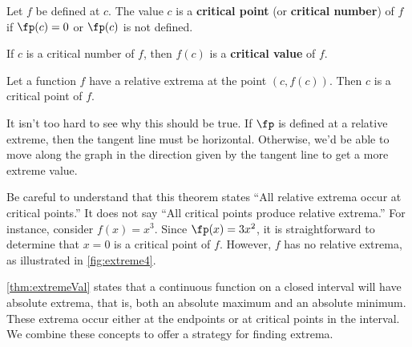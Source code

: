 \begin{definition}\label{def:criticalnum}
Let $f$ be defined at $c$. The value $c$ is a \textbf{critical point} (or \textbf{critical number}) of $f$ if $\fp(c)=0$ or $\fp(c)$ is not defined.\bigskip

If $c$ is a critical number of $f$, then $f(c)$ is a \textbf{critical value} of $f$.
\end{definition}

\begin{theorem}\label{thm:criticalpts}
Let a function $f$ have a relative extrema at the point $(c,f(c))$. Then $c$ is a critical point of $f$.
\end{theorem}%

It isn't too hard to see why this should be true.  If $\fp$ is defined at a relative extreme, then the tangent line must be horizontal.  Otherwise, we'd be able to move along the graph in the direction given by the tangent line to get a more extreme value.


Be careful to understand that this theorem states  ``All relative extrema occur at critical points.'' It does not say ``All critical points produce relative extrema.'' For instance, consider $f(x) = x^3$. Since $\fp(x) = 3x^2$, it is straightforward to determine that $x=0$ is a critical point of $f$. However, $f$ has no relative extrema, as illustrated in \autoref{fig:extreme4}.\bigskip

\autoref{thm:extremeVal} states that a continuous function on a closed interval will have absolute extrema, that is, both an absolute maximum and an absolute minimum. These extrema occur either at the endpoints or at critical points in the interval. We combine these concepts to offer a strategy for finding extrema.

